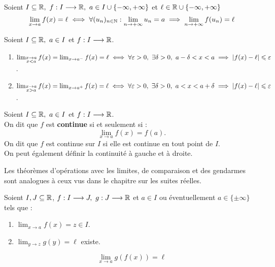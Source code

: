 \begin{theorem}
	Soient $I \subseteq \mathbb{R},\ f : I \longrightarrow \mathbb{R},\ a \in I \cup \{-\infty, +\infty\}$ et $\ell \in \mathbb{R} \cup \{-\infty, +\infty\}$
	\[ \lim_{x \to a} f(x) = \ell \iff \forall (u_n)_{n \in \mathbb{N}} : \lim_{n \to +\infty} u_n = a \implies \lim_{n \to +\infty} f(u_n) = \ell \]
\end{theorem}

\begin{definition}
    Soient $I \subseteq \mathbb{R},\ a \in I$ et $f : I \longrightarrow \mathbb{R} $.
    \begin{enumerate}
        \item $ \lim_{\substack{x \to a \\ x < a}} f(x) = \lim_{x \to a^-} f(x) = \ell \iff \forall \varepsilon > 0,\ \exists \delta > 0,\ a - \delta < x < a \implies \abs{f(x) - \ell} \leq \varepsilon $.
        \item $\lim_{\substack{x \to a \\ x > a}} f(x) = \lim_{x \to a^+} f(x) = \ell \iff \forall \varepsilon > 0,\ \exists \delta > 0,\ a < x < a + \delta \implies \abs{f(x) - \ell} \leq \varepsilon$.
    \end{enumerate}
\end{definition}

\begin{definition}[Continuité]
	Soient $I \subseteq \mathbb{R},\ a \in I$ et $f : I \longrightarrow \mathbb{R}$.
        \\ 
        On dit que $f$ est \textbf{continue} si et seulement si :
        \[\lim_{x \to a} f(x) = f(a).\] 
	On dit que $f$ est continue sur $I$ si elle est continue en tout point de $I$.\\
	On peut également définir la continuité à gauche et à droite.
\end{definition}

\begin{remark}
	Les théorèmes d'opérations avec les limites, de comparaison et des gendarmes sont analogues à ceux vus  dans le chapitre sur les suites réelles.
\end{remark}

\begin{theorem}
	Soient $I, J \subseteq \mathbb{R}$, $f : I \longrightarrow J,\ g : J \longrightarrow \mathbb{R}$ et $a \in I$ ou éventuellement $a \in \{ \pm \infty \}$ tels que :
	\begin{enumerate}
		\item $\lim_{x \to a} f(x) = z \in I$.
		\item $\lim_{y \to z} g(y) = \ell$ existe.
	\end{enumerate}
	\[ \lim_{x \to a} g(f(x)) = \ell \]
\end{theorem}

